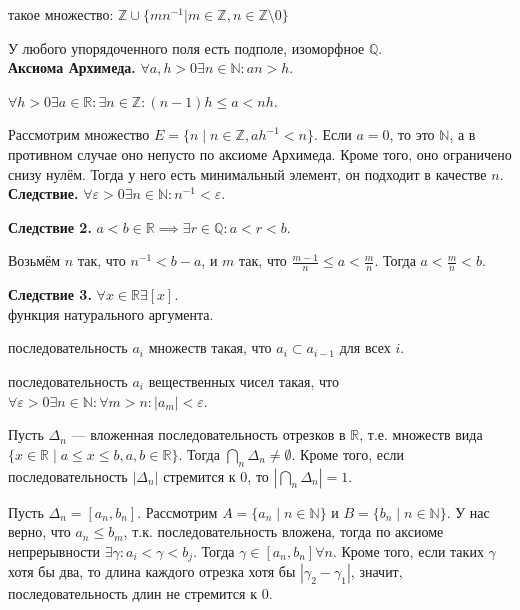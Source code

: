 \documentclass[12pt,a4paper]{article}
\begin{document}
 такое множество: $\mathbb Z\cup \{mn^{-1}|m\in \mathbb Z,n\in\mathbb Z\setminus 0\}$

\theorem У любого упорядоченного поля есть подполе, изоморфное $\mathbb Q$.\\

\textbf{Аксиома Архимеда.} $\forall a,h>0\exists n\in\mathbb N:an>h$.

 $\forall h>0\exists a\in \mathbb R:\exists n\in \mathbb Z:(n-1)h\leq a<nh$.

\proof Рассмотрим множество $E=\{n\mid n\in\mathbb Z,ah^{-1}<n\}$. Если $a=0$, то это $\mathbb N$, а в противном случае оно непусто по аксиоме Архимеда. Кроме того, оно ограничено снизу нулём. Тогда у него есть минимальный элемент, он подходит в качестве $n$. \QEDA\\

\textbf{Следствие.} $\forall\varepsilon>0\exists n\in \mathbb N:n^{-1}<\varepsilon$.

\textbf{Следствие 2.} $a<b\in \mathbb R\implies \exists r\in \mathbb Q:a<r<b$.

\proof Возьмём $n$ так, что $n^{-1}<b-a$, и $m$ так, что $\frac{m-1}{n}\leq a<\frac{m}{n}$. Тогда $a<\frac{m}{n}<b$. \QEDA

\textbf{Следствие 3.} $\forall x\in \mathbb R\exists[x]$.\\

 функция натурального аргумента.

 последовательность $a_i$ множеств такая, что $a_i\subset a_{i-1}$ для всех $i$.

 последовательность $a_i$ вещественных чисел такая, что $\forall \varepsilon>0\exists n\in \mathbb N:\forall m>n:|a_m|<\varepsilon$.

\theorem Пусть $\Delta_n$ --- вложенная последовательность отрезков в $\mathbb R$, т.е. множеств вида $\{x\in \mathbb R\mid a\leq x\leq b,a,b\in\mathbb R\}$. Тогда $\bigcap_n \Delta_n\neq\emptyset$. Кроме того, если последовательность $|\Delta_n|$ стремится к $0$, то $|\bigcap_n\Delta_n|=1$.

\proof Пусть $\Delta_n=[a_n,b_n]$. Рассмотрим $A=\{a_n\mid n\in \mathbb N\}$ и $B=\{b_n\mid n\in \mathbb N\}$. У нас верно, что $a_n\leq b_m$, т.к. последовательность вложена, тогда по аксиоме непрерывности $\exists\gamma:a_i<\gamma<b_j$. Тогда $\gamma\in[a_n,b_n]\forall n$. Кроме того, если таких $\gamma$ хотя бы два, то длина каждого отрезка хотя бы $|\gamma_2-\gamma_1|$, значит, последовательность длин не стремится к 0. \QEDA\\
\end{document}
